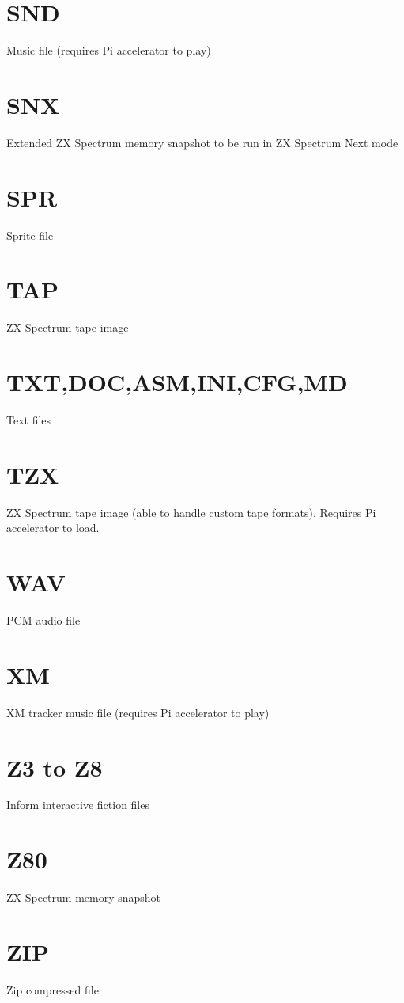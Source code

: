 \section{SND}
Music file (requires Pi accelerator to play)
\section{SNX}
Extended ZX Spectrum memory snapshot to be run in ZX Spectrum Next mode
\section{SPR}
Sprite file
\section{TAP}
ZX Spectrum tape image
\section{TXT,DOC,ASM,INI,CFG,MD}
Text files
\section{TZX}
ZX Spectrum tape image (able to handle custom tape formats). Requires
Pi accelerator to load.
\section{WAV}
PCM audio file
\section{XM}
XM tracker music file (requires Pi accelerator to play)
\section{Z3 to Z8}
Inform interactive fiction files
\section{Z80}
ZX Spectrum memory snapshot
\section{ZIP}
Zip compressed file
